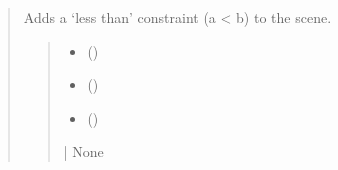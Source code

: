 \documentclass[letterpaper,10pt,english]{sphinxmanual}
\begin{document}
\begin{quote}
\begin{fulllineitems}
\begin{fulllineitems}
\begin{quote}
\begin{description}
\end{description}\end{quote}

\end{fulllineitems}


\begin{fulllineitems}
\label{\detokenize{pygeox:pygeox.constraint.ConstraintNamespace.lt}}
\pysigstartsignatures
\pysiglinewithargsret
{}
{\sphinxparamcomma {}\sphinxparamcomma {}}
{}
\pysigstopsignatures
\sphinxAtStartPar
Adds a ‘less than’ constraint (a \textless{} b) to the scene.
\begin{quote}\begin{description}
\begin{itemize}
\item {} 
\sphinxAtStartPar
{} (\sphinxstyleliteralemphasis{\sphinxupquote{ | }}\sphinxstyleliteralemphasis{\sphinxupquote{ | }})

\item {} 
\sphinxAtStartPar
{} (\sphinxstyleliteralemphasis{\sphinxupquote{ | }}\sphinxstyleliteralemphasis{\sphinxupquote{ | }})

\item {} 
\sphinxAtStartPar
{} (\sphinxstyleliteralemphasis{\sphinxupquote{ | }})

\end{itemize}

\sphinxAtStartPar
{} | None

\end{description}\end{quote}


\end{fulllineitems}
\end{fulllineitems}
\end{quote}
\end{document}
